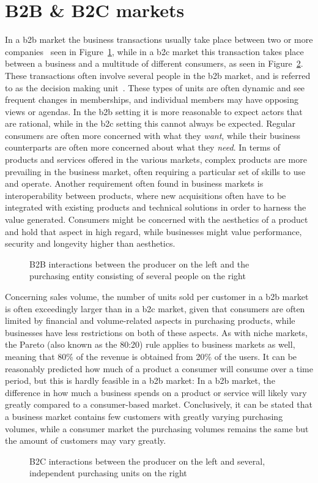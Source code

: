 \section{B2B \& B2C markets}
In a \gls{b2b} market the business transactions usually take place between two or more companies~\cite{jewels2001towards} seen in Figure~\ref{fig:b2b}, while in a \gls{b2c} market this transaction takes place between a business and a multitude of different consumers, as seen in Figure~\ref{fig:b2c}. These transactions often involve several people in the \gls{b2b} market, and is referred to as the decision making unit~\cite{paulhaguenickhaguematthewharrison}. These types of units are often dynamic and see frequent changes in memberships, and individual members may have opposing views or agendas. In the \gls{b2b} setting it is more reasonable to expect actors that are rational, while in the \gls{b2c} setting this cannot always be expected. Regular consumers are often more concerned with what they \textit{want}, while their business counterparts are often more concerned about what they \textit{need}. In terms of products and services offered in the various markets, complex products are more prevailing in the business market, often requiring a particular set of skills to use and operate. Another requirement often found in business markets is interoperability between products, where new acquisitions often have to be integrated with existing products and technical solutions in order to harness the value generated. Consumers might be concerned with the aesthetics of a product and hold that aspect in high regard, while businesses might value performance, security and longevity higher than aesthetics. 
\begin{figure}[H]
    \centering
    \caption{B2B interactions between the producer on the left and the purchasing entity consisting of several people on the right}
    \label{fig:b2b}
\end{figure}
Concerning sales volume, the number of units sold per customer in a \gls{b2b} market is often exceedingly larger than in a \gls{b2c} market, given that consumers are often limited by financial and volume-related aspects in purchasing products, while businesses have less restrictions on both of these aspects. As with niche markets, the Pareto (also known as the 80:20) rule applies to business markets as well, meaning that 80\% of the revenue is obtained from 20\% of the users. It can be reasonably predicted how much of a product a consumer will consume over a time period, but this is hardly feasible in a \gls{b2b} market: In a \gls{b2b} market, the difference in how much a business spends on a product or service will likely vary greatly compared to a consumer-based market. Conclusively, it can be stated that a business market contains few customers with greatly varying purchasing volumes, while a consumer market the purchasing volumes remains the same but the amount of customers may vary greatly.
\begin{figure}[H]
    \centering
    \caption{B2C interactions between the producer on the left and several, independent purchasing units on the right}
    \label{fig:b2c}
\end{figure}

